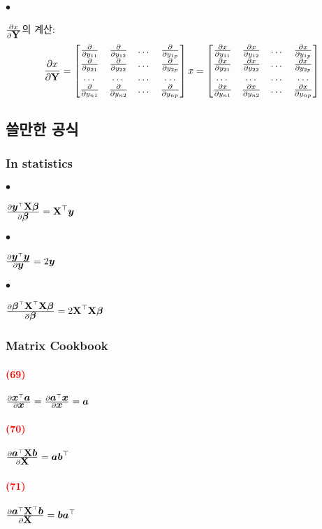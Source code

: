 \documentclass[12pt,oneside,english,a4paper]{article}
\def\ck{\paragraph{\Large$\bullet$}\Large}
\newcommand{\parared}[1]{\paragraph{\Large\textcolor{red}{(#1)}}\Large}
\newcommand{\bs}[1]{\mbox{\boldmath $#1$}}
\newcommand{\bsa}{\mbox{\boldmath $a$}}
\newcommand{\bsb}{\mbox{\boldmath $b$}}
\newcommand{\bsx}{\mbox{\boldmath $x$}}
\newcommand{\bsy}{\mbox{\boldmath $y$}}
\newcommand{\bfX}{\mbox{$\bf{X}$}}
\newcommand{\bfY}{\mbox{$\bf{Y}$}}
\begin{document}
\ck $\frac{\partial x}{\partial \bfY}$의 계산: 
\[
\frac{\partial x}{\partial \bfY}=
\begin{bmatrix}
\frac{\partial}{\partial y_{11}} & \frac{\partial}{\partial y_{12}} & \dots & \frac{\partial}{\partial y_{1p}} \\ 
\frac{\partial}{\partial y_{21}} & \frac{\partial}{\partial y_{22}} & \dots & \frac{\partial}{\partial y_{2p}} \\
\dots & \dots & \dots & \dots \\
\frac{\partial}{\partial y_{n1}} & \frac{\partial}{\partial y_{n2}} & \dots & \frac{\partial}{\partial y_{np}} 
\end{bmatrix}x
=\begin{bmatrix}
\frac{\partial x}{\partial y_{11}} & \frac{\partial x}{\partial y_{12}} & \dots & \frac{\partial x}{\partial y_{1p}} \\ 
\frac{\partial x}{\partial y_{21}} & \frac{\partial x}{\partial y_{22}} & \dots & \frac{\partial x}{\partial y_{2p}} \\
\dots & \dots & \dots & \dots \\
\frac{\partial x}{\partial y_{n1}} & \frac{\partial x}{\partial y_{n2}} & \dots & \frac{\partial x}{\partial y_{np}} 
\end{bmatrix}
\]

\subsection{쓸만한 공식}
\subsubsection{In statistics}
\ck $\frac{\partial\bsy^\top\bfX\bs{\beta}}{\partial\bs{\beta}}=\bfX^\top\bsy$

\ck $\frac{\partial\bsy^\top\bsy}{\partial\bsy}=2\bsy$

\ck $\frac{\partial\bs{\beta}^\top\bfX^\top\bfX\bs{\beta}}{\partial\bs{\beta}}=2\bfX^\top\bfX\bs{\beta}$

\subsubsection{Matrix Cookbook}
\parared{69} $\frac{\partial\bsx^\top\bsa}{\partial\bsx}=\frac{\partial\bsa^\top\bsx}{\partial\bsx}=\bsa$

\parared{70} $\frac{\partial\bsa^\top\bfX\bsb}{\partial\bfX}=\bsa\bsb^\top$

\parared{71} $\frac{\partial\bsa^\top\bfX^\top\bsb}{\partial\bfX}=\bsb\bsa^\top$
\end{document}
